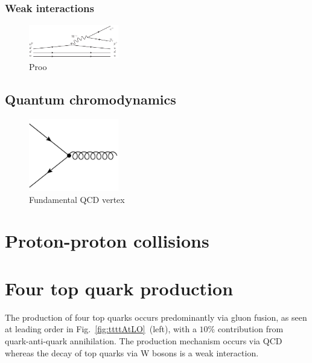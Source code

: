 \subsubsection{Weak interactions}

\begin{figure}[ht!]
\begin{center}
    \includegraphics[width=0.35\textwidth]{images/Theory/weakDecay.png}
    \caption{Proo}
    \label{fig:QEDvertex}
\end{center}
\end{figure}

\subsection{Quantum chromodynamics}
\label{subsec:QCD}
\begin{figure}[ht!]
\begin{center}
    \includegraphics[width=0.35\textwidth]{images/Theory/QCDvertex.png}
    \caption{Fundamental QCD vertex}
    \label{fig:QCDvertex}
\end{center}
\end{figure}



\section{Proton-proton collisions}

\section{Four top quark production}

The production of four top quarks occurs predominantly via gluon fusion, as seen at leading order in Fig.~\ref{fig:ttttAtLO}~(left), with a $10\%$ contribution from quark-anti-quark annihilation. The production mechanism occurs via QCD whereas the decay of top quarks via W bosons is a weak interaction. 

